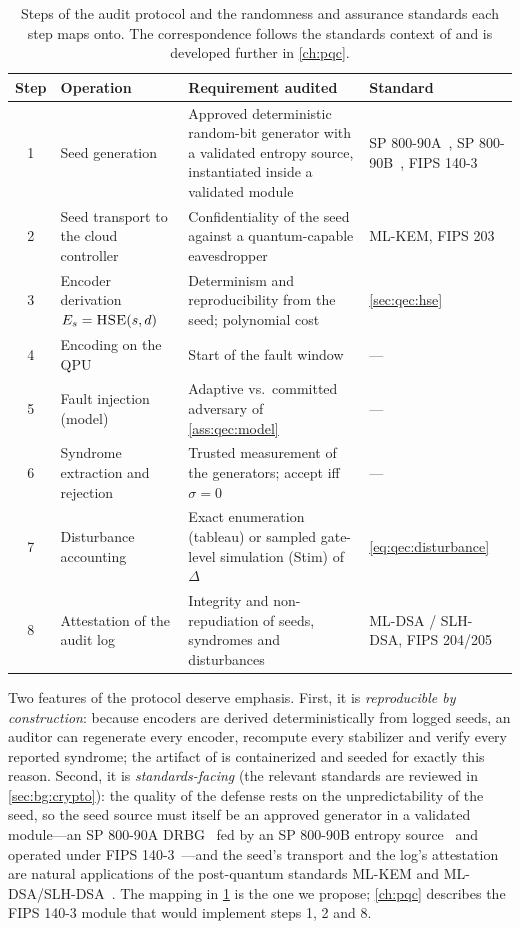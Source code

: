 \begin{table}[htbp]
\caption{Steps of the audit protocol and the randomness and assurance standards each step maps onto. The correspondence follows the standards context of \cite{guo2026qecaudit} and is developed further in \cref{ch:pqc}.}
\label{tab:qec:protocol}
\centering\footnotesize
\begin{tabularx}{\textwidth}{@{}c p{2.9cm} X p{3.9cm}@{}}
\toprule
Step & Operation & Requirement audited & Standard \\
\midrule
1 & Seed generation & Approved deterministic random-bit generator with a validated entropy source, instantiated inside a validated module & SP 800-90A~\cite{nist2015sp80090a}, SP 800-90B~\cite{nist2018sp80090b}, FIPS 140-3~\cite{nist2019fips1403} \\
2 & Seed transport to the cloud controller & Confidentiality of the seed against a quantum-capable eavesdropper & ML-KEM, FIPS 203~\cite{nist2024fips203} \\
3 & Encoder derivation $E_s=\textsc{HSE}(s,d)$ & Determinism and reproducibility from the seed; polynomial cost & \cref{sec:qec:hse} \\
4 & Encoding on the QPU & Start of the fault window & --- \\
5 & Fault injection (model) & Adaptive vs.\ committed adversary of \cref{ass:qec:model} & --- \\
6 & Syndrome extraction and rejection & Trusted measurement of the generators; accept iff $\sigma=0$ & --- \\
7 & Disturbance accounting & Exact enumeration (tableau) or sampled gate-level simulation (Stim) of $\Delta$ & \cref{eq:qec:disturbance} \\
8 & Attestation of the audit log & Integrity and non-repudiation of seeds, syndromes and disturbances & ML-DSA / SLH-DSA, FIPS 204/205~\cite{nist2024fips204,nist2024fips205} \\
\bottomrule
\end{tabularx}
\end{table}

Two features of the protocol deserve emphasis. First, it is \emph{reproducible by construction}: because encoders are derived deterministically from logged seeds, an auditor can regenerate every encoder, recompute every stabilizer and verify every reported syndrome; the artifact of \cite{guo2026qecaudit} is containerized and seeded for exactly this reason. Second, it is \emph{standards-facing} (the relevant standards are reviewed in \cref{sec:bg:crypto}): the quality of the defense rests on the unpredictability of the seed, so the seed source must itself be an approved generator in a validated module---an SP 800-90A DRBG~\cite{nist2015sp80090a} fed by an SP 800-90B entropy source~\cite{nist2018sp80090b} and operated under FIPS 140-3~\cite{nist2019fips1403}---and the seed's transport and the log's attestation are natural applications of the post-quantum standards ML-KEM and ML-DSA/SLH-DSA~\cite{nist2024fips203,nist2024fips204,nist2024fips205}. The mapping in \cref{tab:qec:protocol} is the one we propose; \cref{ch:pqc} describes the FIPS 140-3 module that would implement steps 1, 2 and 8.

